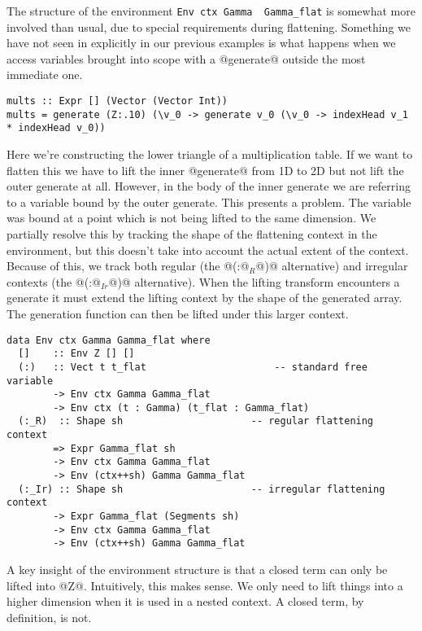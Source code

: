 The structure of the environment \lstinline[style=ndp]{Env ctx Gamma  Gamma_flat} is somewhat more involved than usual, due to special requirements during flattening. Something we have not seen in explicitly in our previous examples is what happens when we access variables brought into scope with a @generate@ outside the most immediate one.
%
\begin{lstlisting}
mults :: Expr [] (Vector (Vector Int))
mults = generate (Z:.10) (\v_0 -> generate v_0 (\v_0 -> indexHead v_1 * indexHead v_0))
\end{lstlisting}
%
Here we're constructing the lower triangle of a multiplication table. If we want to flatten this we have to lift the inner @generate@ from 1D to 2D but not lift the outer generate at all. However, in the body of the inner generate we are referring to a variable bound by the outer generate. This presents a problem. The variable was bound at a point which is not being lifted to the same dimension. We partially resolve this by tracking the shape of the flattening context in the environment, but this doesn't take into account the actual extent of the context. Because of this, we track both regular (the @(:@$_R$@)@ alternative) and irregular contexts (the @(:@$_{Ir}$@)@ alternative). When the lifting transform encounters a generate it must extend the lifting context by the shape of the generated array. The generation function can then be lifted under this larger context.
%
\begin{lstlisting}[style=ndp]
data Env ctx Gamma Gamma_flat where
  []    :: Env Z [] []
  (:)   :: Vect t t_flat                      -- standard free variable
        -> Env ctx Gamma Gamma_flat
        -> Env ctx (t : Gamma) (t_flat : Gamma_flat)
  (:_R)  :: Shape sh                      -- regular flattening context
        => Expr Gamma_flat sh
        -> Env ctx Gamma Gamma_flat
        -> Env (ctx++sh) Gamma Gamma_flat
  (:_Ir) :: Shape sh                      -- irregular flattening context
        -> Expr Gamma_flat (Segments sh)
        -> Env ctx Gamma Gamma_flat
        -> Env (ctx++sh) Gamma Gamma_flat
\end{lstlisting}

A key insight of the environment structure is that a closed term can only be lifted into @Z@. Intuitively, this makes sense. We only need to lift things into a higher dimension when it is used in a nested context. A closed term, by definition, is not.

